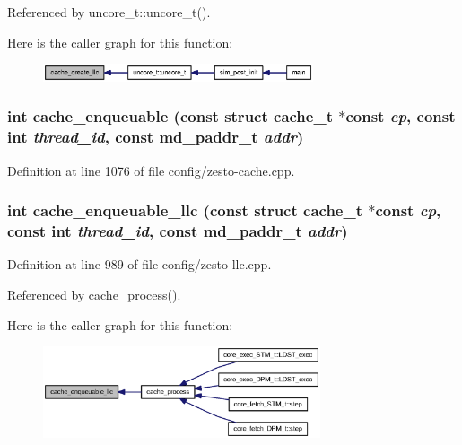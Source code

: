 Referenced by uncore\_\-t::uncore\_\-t().

Here is the caller graph for this function:\nopagebreak
\begin{figure}[H]
\begin{center}
\leavevmode
\includegraphics[width=226pt]{config_2zesto-cache_8h_8e1bb5340056d589c19813cbc1ab6318_icgraph}
\end{center}
\end{figure}
\subsubsection[{cache\_\-enqueuable}]{\setlength{\rightskip}{0pt plus 5cm}int cache\_\-enqueuable (const struct {\bf cache\_\-t} $\ast$const  {\em cp}, \/  const int {\em thread\_\-id}, \/  const {\bf md\_\-paddr\_\-t} {\em addr})}\label{config_2zesto-cache_8h_35c7c82c117f5713ec55d40f831060da}




Definition at line 1076 of file config/zesto-cache.cpp.
\subsubsection[{cache\_\-enqueuable\_\-llc}]{\setlength{\rightskip}{0pt plus 5cm}int cache\_\-enqueuable\_\-llc (const struct {\bf cache\_\-t} $\ast$const  {\em cp}, \/  const int {\em thread\_\-id}, \/  const {\bf md\_\-paddr\_\-t} {\em addr})}\label{config_2zesto-cache_8h_17919e2800a0393570b40f08156cb42c}




Definition at line 989 of file config/zesto-llc.cpp.

Referenced by cache\_\-process().

Here is the caller graph for this function:\nopagebreak
\begin{figure}[H]
\begin{center}
\leavevmode
\includegraphics[width=232pt]{config_2zesto-cache_8h_17919e2800a0393570b40f08156cb42c_icgraph}
\end{center}
\end{figure}
